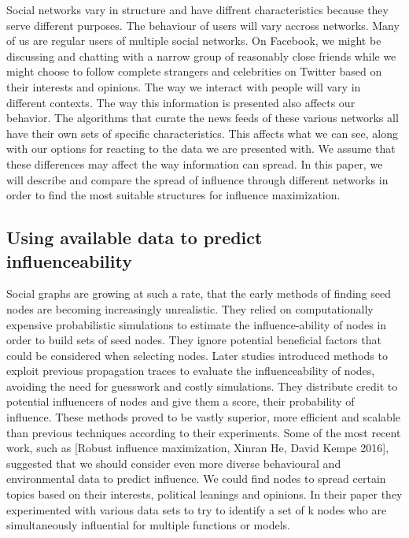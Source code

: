 \documentclass{acm_proc_article-sp}
\begin{document}
Social networks vary in structure and have diffrent characteristics because they serve different purposes. The behaviour of users will vary accross networks. Many of us are regular users of multiple social networks. On Facebook, we might be discussing and chatting with a narrow group of reasonably close friends while we might choose to follow complete strangers and celebrities on Twitter based on their interests and opinions. The way we interact with people will vary in different contexts. The way this information is presented also affects our behavior. The algorithms that curate the news feeds of these various networks all have their own sets of specific characteristics. This affects what we can see, along with our options for reacting to the data we are presented with. We assume that these differences may affect the way information can spread. In this paper, we will describe and compare the spread of influence through different networks in order to find the most suitable structures for influence maximization.

\subsection{Using available data to predict\\ influenceability}
Social graphs are growing at such a rate, that the early methods of finding seed nodes are becoming increasingly unrealistic. They relied on computationally expensive probabilistic simulations to estimate the influence-ability of nodes in order to build sets of seed nodes. They ignore potential beneficial factors that could be considered when selecting nodes. Later studies introduced methods to exploit previous propagation traces to evaluate the influenceability of nodes, avoiding the need for guesswork and costly simulations.\cite{goyal:datainfluence} They distribute credit to potential influencers of nodes and give them a score, their probability of influence. These methods proved to be vastly superior, more efficient and scalable than previous techniques according to their experiments. Some of the most recent work, such as [Robust influence maximization, Xinran He, David Kempe 2016], suggested that we should consider even more diverse behavioural and environmental data to predict influence. We could find nodes to spread certain topics based on their interests, political leanings and opinions. In their paper they experimented with various data sets to try to identify a set of k nodes who are simultaneously influential for multiple functions or models.
\end{document}
